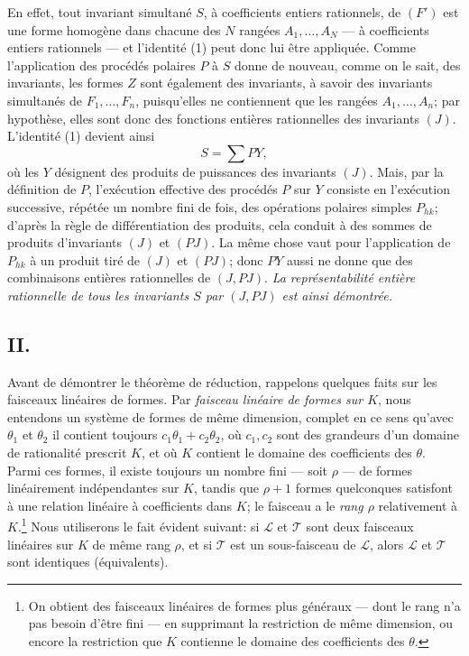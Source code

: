 En effet, tout invariant simultané $S$, à coefficients entiers rationnels, de $(F')$ est une forme homogène dans chacune des $N$ rangées $A_1,\ldots,A_N$ --- à coefficients entiers rationnels --- et l'identité (1) peut donc lui être appliquée. Comme l'application des procédés polaires $P$ à $S$ donne de nouveau, comme on le sait, des invariants, les formes $Z$ sont également des invariants, à savoir des invariants simultanés de $F_1,\ldots,F_n$, puisqu'elles ne contiennent que les rangées $A_1,\ldots,A_n$; par hypothèse, elles sont donc des fonctions entières rationnelles des invariants $(J)$. L'identité (1) devient ainsi
\[
  S=\sum PY,
\]
où les $Y$ désignent des produits de puissances des invariants $(J)$. Mais, par la définition de $P$, l'exécution effective des procédés $P$ sur $Y$ consiste en l'exécution successive, répétée un nombre fini de fois, des opérations polaires simples $P_{hk}$; d'après la règle de différentiation des produits, cela conduit à des sommes de produits d'invariants $(J)$ et $(PJ)$. La même chose vaut pour l'application de $P_{hk}$ à un produit tiré de $(J)$ et $(PJ)$; donc $PY$ aussi ne donne que des combinaisons entières rationnelles de $(J,PJ)$. \emph{La représentabilité entière rationnelle de tous les invariants $S$ par $(J,PJ)$ est ainsi démontrée.}

\subsection*{II.}
Avant de démontrer le théorème de réduction, rappelons quelques faits sur les faisceaux linéaires de formes. Par \emph{faisceau linéaire de formes sur $K$}, nous entendons un système de formes de même dimension, complet en ce sens qu'avec $\theta_1$ et $\theta_2$ il contient toujours $c_1\theta_1+c_2\theta_2$, où $c_1,c_2$ sont des grandeurs d'un domaine de rationalité prescrit $K$, et où $K$ contient le domaine des coefficients des $\theta$. Parmi ces formes, il existe toujours un nombre fini --- soit $\rho$ --- de formes linéairement indépendantes sur $K$, tandis que $\rho+1$ formes quelconques satisfont à une relation linéaire à coefficients dans $K$; le faisceau a le \emph{rang $\rho$} relativement à $K$.\footnote{On obtient des faisceaux linéaires de formes plus généraux --- dont le rang n'a pas besoin d'être fini --- en supprimant la restriction de même dimension, ou encore la restriction que $K$ contienne le domaine des coefficients des $\theta$.} Nous utiliserons le fait évident suivant: si $\mathcal L$ et $\mathcal T$ sont deux faisceaux linéaires sur $K$ de même rang $\rho$, et si $\mathcal T$ est un sous-faisceau de $\mathcal L$, alors $\mathcal L$ et $\mathcal T$ sont identiques (équivalents).

